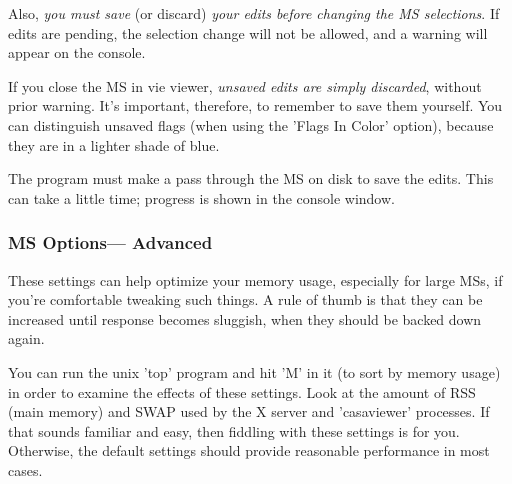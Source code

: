 \begin{itemize}
Also, {\it you must save} (or discard) {\it your edits before changing the 
MS selections}.  If edits are pending, the selection change will not be 
allowed, and a warning will appear on the console.  

If you close the MS in vie viewer, {\it unsaved edits are simply discarded},
without prior warning.  It's important, therefore, to remember to save them
yourself.  You can distinguish unsaved flags (when using the 'Flags In Color'
option), because they are in a lighter shade of blue.

The program must make a pass through the MS on disk to save the edits.
This can take a little time; progress is shown in the console window.

\end{itemize}



\subsubsection{MS Options---  Advanced}
\label{section:display.ms.adjust.adv}

These settings can help optimize your memory usage, especially for
large MSs, if you're comfortable tweaking such things.  A rule of thumb
is that they can be increased until response becomes sluggish, when
they should be backed down again.

You can run the unix 'top' program and hit 'M' in it (to sort by memory
usage) in order to examine the effects of these settings.  Look at the
amount of RSS (main memory) and SWAP used by the X server and 'casaviewer'
processes.  If that sounds familiar and easy, then fiddling with these
settings is for you.  Otherwise, the default settings should provide
reasonable performance in most cases.

